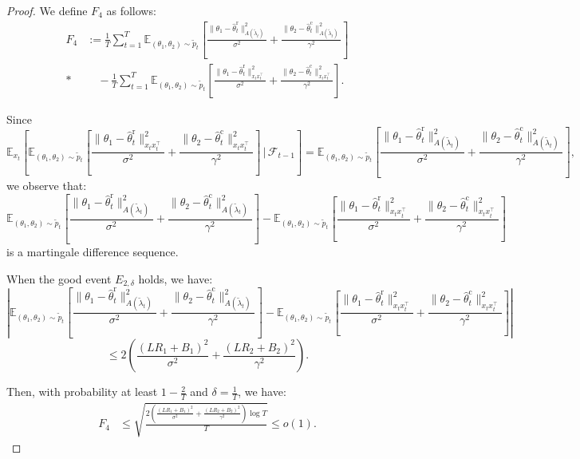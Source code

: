 \documentclass[accepted]{uai2025} %
\theoremstyle{plain}
\theoremstyle{definition}
\theoremstyle{remark}
\begin{document}
\begin{proof}
    We define \( F_4 \) as follows:
    \begin{align*}
        F_4 &:= \frac{1}{T} \sum_{t=1}^{T} \mathbb{E}_{(\theta_1, \theta_2) \sim \tilde{p}_t} 
        \left[ \frac{\|\theta_1 - \hat{\theta}_t^{\mathrm{r}}\|_{A(\tilde{\lambda}_t)}^2}{\sigma^2} + \frac{\|\theta_2 - \hat{\theta}_t^{\mathrm{c}}\|_{A(\tilde{\lambda}_t)}^2}{\gamma^2}  \right] \\*
        &\quad - \frac{1}{T} \sum_{t=1}^{T} \mathbb{E}_{(\theta_1, \theta_2) \sim \tilde{p}_t} 
        \left[ \frac{\|\theta_1 - \hat{\theta}_t^{\mathrm{r}}\|_{x_t x_t^\top}^2}{\sigma^2} + \frac{\|\theta_2 - \hat{\theta}_t^{\mathrm{c}}\|_{x_t x_t^\top}^2}{\gamma^2}  \right].
    \end{align*}

    Since $$ \mathbb{E}_{x_t} \left[ \mathbb{E}_{(\theta_1, \theta_2) \sim \tilde{p}_t} \left[  \frac{\|\theta_1 - \hat{\theta}_t^{\mathrm{r}}\|_{x_t x_t^\top}^2}{\sigma^2} + \frac{\|\theta_2 - \hat{\theta}_t^{\mathrm{c}}\|_{x_t x_t^\top}^2}{\gamma^2}  \right] \,\bigg|\,  \mathcal{F}_{t-1} \right] 
    = \mathbb{E}_{(\theta_1, \theta_2) \sim \tilde{p}_t} \left[ \frac{\|\theta_1 - \hat{\theta}_t^{\mathrm{r}}\|_{A(\tilde{\lambda}_t)}^2}{\sigma^2} + \frac{\|\theta_2 - \hat{\theta}_t^{\mathrm{c}}\|_{A(\tilde{\lambda}_t)}^2}{\gamma^2}  \right], $$  
    we observe that:
    \[
    \mathbb{E}_{(\theta_1, \theta_2) \sim \tilde{p}_t} \left[ \frac{\|\theta_1 - \hat{\theta}_t^{\mathrm{r}}\|_{A(\tilde{\lambda}_t)}^2}{\sigma^2} + \frac{\|\theta_2 - \hat{\theta}_t^{\mathrm{c}}\|_{A(\tilde{\lambda}_t)}^2}{\gamma^2}  \right]
    - \mathbb{E}_{(\theta_1, \theta_2) \sim \tilde{p}_t} \left[ \frac{\|\theta_1 - \hat{\theta}_t^{\mathrm{r}}\|_{x_t x_t^\top}^2}{\sigma^2} + \frac{\|\theta_2 - \hat{\theta}_t^{\mathrm{c}}\|_{x_t x_t^\top}^2}{\gamma^2}  \right]
    \]
    is a martingale difference sequence.

   When the good event \( E_{2, \delta} \) holds, we have:
\[
\left| \mathbb{E}_{(\theta_1, \theta_2) \sim \tilde{p}_t} \left[ \frac{\|\theta_1 - \hat{\theta}_t^{\mathrm{r}}\|_{A(\tilde{\lambda}_t)}^2}{\sigma^2} + \frac{\|\theta_2 - \hat{\theta}_t^{\mathrm{c}}\|_{A(\tilde{\lambda}_t)}^2}{\gamma^2}  \right]
- \mathbb{E}_{(\theta_1, \theta_2) \sim \tilde{p}_t} \left[  \frac{\|\theta_1 - \hat{\theta}_t^{\mathrm{r}}\|_{x_t x_t^\top}^2}{\sigma^2} + \frac{\|\theta_2 - \hat{\theta}_t^{\mathrm{c}}\|_{x_t x_t^\top}^2}{\gamma^2}  \right] \right|
\]
\[
\le 2 \left( \frac{(LR_1 + B_1)^2}{\sigma^2} + \frac{(LR_2 + B_2)^2}{\gamma^2} \right).
\]

Then, with probability at least \( 1 - \frac{2}{T} \) and \( \delta = \frac{1}{T} \), we have:
\begin{align*}
    F_4 &\le \sqrt{\frac{2 \left( \frac{(LR_1 + B_1)^2}{\sigma^2} + \frac{(LR_2 + B_2)^2}{\gamma^2} \right) \log T}{T}}  \le o(1).
\end{align*}

\end{proof}
\end{document}

